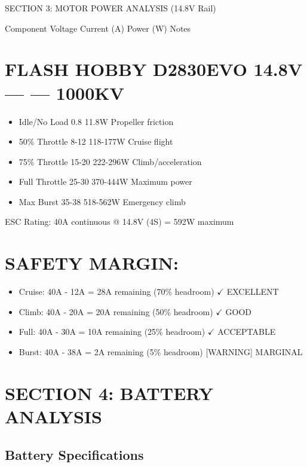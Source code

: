 \documentclass[11pt,letterpaper]{article}
\begin{document}
SECTION 3: MOTOR POWER ANALYSIS (14.8V Rail)\par

Component               Voltage    Current (A)    Power (W)    Notes\par

\section{FLASH HOBBY D2830EVO     14.8V        ---           ---        1000KV}

\begin{itemize}
  \item Idle/No Load                      0.8          11.8W       Propeller friction
  \item 50\% Throttle                      8-12        118-177W     Cruise flight
  \item 75\% Throttle                     15-20        222-296W     Climb/acceleration
  \item Full Throttle                    25-30        370-444W     Maximum power
  \item Max Burst                        35-38        518-562W     Emergency climb
\end{itemize}

ESC Rating: 40A continuous @ 14.8V (4S) = 592W maximum\par

\section{SAFETY MARGIN:}

\begin{itemize}
  \item Cruise:   40A - 12A = 28A remaining (70\% headroom)  $\checkmark$ EXCELLENT
  \item Climb:    40A - 20A = 20A remaining (50\% headroom)  $\checkmark$ GOOD
  \item Full:     40A - 30A = 10A remaining (25\% headroom)  $\checkmark$ ACCEPTABLE
  \item Burst:    40A - 38A = 2A remaining  (5\% headroom)   [WARNING] MARGINAL
\end{itemize}

\section{SECTION 4: BATTERY ANALYSIS}

\subsection{Battery Specifications}
\end{document}
